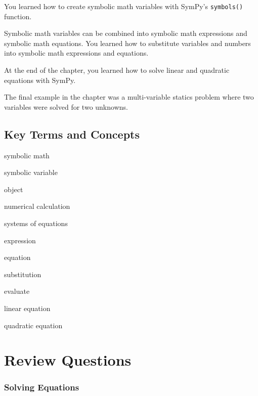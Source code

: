 \documentclass{book}
\newenvironment{key_terms}{\begin{multicols}{3}}{\end{multicols}} %
\newcommand{\passthrough}[1]{#1}
\begin{document}
You learned how to create symbolic math variables with SymPy's
\passthrough{\lstinline!symbols()!} function.

Symbolic math variables can be combined into symbolic math expressions
and symbolic math equations. You learned how to substitute variables and
numbers into symbolic math expressions and equations.

At the end of the chapter, you learned how to solve linear and quadratic
equations with SymPy.

The final example in the chapter was a multi-variable statics problem
where two variables were solved for two unknowns.
    




    
        \hypertarget{key-terms-and-concepts}{%
\subsection{Key Terms and Concepts}\label{key-terms-and-concepts}}
    




    
        \begin{key_terms}
        symbolic math

symbolic variable

object

numerical calculation

systems of equations

expression

equation

substitution

evaluate

linear equation

quadratic equation
        \end{key_terms}

    




    
        \hypertarget{review-questions}{%
\section{Review Questions}\label{review-questions}}
    




    
        \hypertarget{solving-equations}{%
\subsubsection{Solving Equations}\label{solving-equations}}
    
\end{document}
